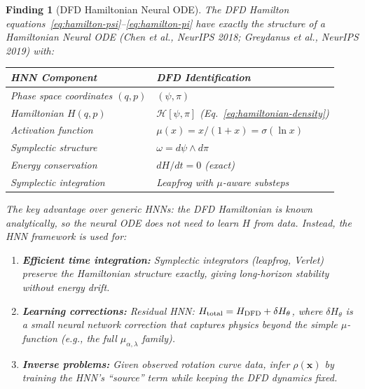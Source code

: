 \documentclass[11pt]{article}
\newtheorem{finding}[theorem]{Finding}
\theoremstyle{definition}
\theoremstyle{remark}
\begin{document}
\begin{finding}[DFD Hamiltonian Neural ODE]
\label{find:dfd-hnn}
The DFD Hamilton equations~\eqref{eq:hamilton-psi}--\eqref{eq:hamilton-pi}
have \emph{exactly} the structure of a Hamiltonian Neural ODE (Chen et al.,
NeurIPS 2018; Greydanus et al., NeurIPS 2019) with:

\begin{center}
\begin{tabular}{@{}ll@{}}
\toprule
\textbf{HNN Component} & \textbf{DFD Identification} \\
\midrule
Phase space coordinates $(q, p)$ & $(\psi, \pi)$ \\
Hamiltonian $H(q, p)$ & $\mathcal{H}[\psi, \pi]$ (Eq.~\ref{eq:hamiltonian-density}) \\
Activation function & $\mu(x) = x/(1+x) = \sigma(\ln x)$ \\
Symplectic structure & $\omega = d\psi \wedge d\pi$ \\
Energy conservation & $dH/dt = 0$ (exact) \\
Symplectic integration & Leapfrog with $\mu$-aware substeps \\
\bottomrule
\end{tabular}
\end{center}

The key advantage over generic HNNs: the DFD Hamiltonian is \emph{known
analytically}, so the neural ODE does not need to learn $H$ from data.
Instead, the HNN framework is used for:
\begin{enumerate}
\item \textbf{Efficient time integration:} Symplectic integrators
  (leapfrog, Verlet) preserve the Hamiltonian structure exactly, giving
  long-horizon stability without energy drift.
\item \textbf{Learning corrections:} Residual HNN: $H_{\rm total} =
  H_{\rm DFD} + \delta H_\theta$, where $\delta H_\theta$ is a small
  neural network correction that captures physics beyond the simple
  $\mu$-function (e.g., the full $\mu_{\alpha,\lambda}$ family).
\item \textbf{Inverse problems:} Given observed rotation curve data,
  infer $\rho(\mathbf{x})$ by training the HNN's ``source'' term
  while keeping the DFD dynamics fixed.
\end{enumerate}
\end{finding}
\end{document}
